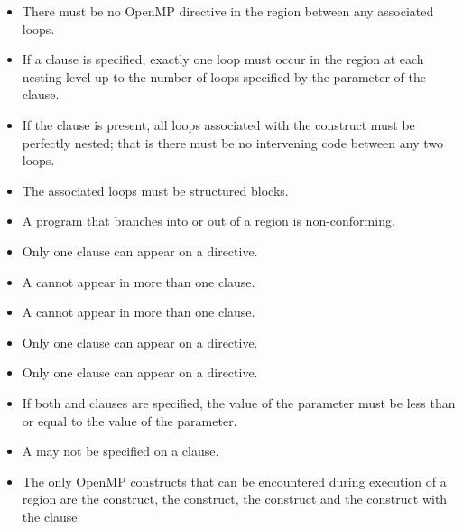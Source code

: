 \restrictions
\begin{itemize}
\item There must be no OpenMP directive in the region between any
associated loops.

\item If a  clause is specified, exactly one loop must
occur in the region at each nesting level up to the number of loops
specified by the parameter of the  clause.

\item If the  clause is present, all loops associated
with the construct must be perfectly nested; that is there must be
no intervening code between any two loops.

\item The associated loops must be structured blocks.

\item A program that branches into or out of a  region is non-conforming.

\item Only one  clause can appear on a  directive.

\item A  cannot appear in more than one  clause.

\item A  cannot appear in more than one  clause.

\item Only one  clause can appear on a  directive.

\item Only one  clause can appear on a  directive.

\item If both  and  clauses are specified, the value of the  parameter must be less than or equal to the value of the  parameter.

\item A  may not be specified on a  clause.

\item The only OpenMP constructs that can be encountered during execution of a
 region are the  construct, the 
construct, the  construct and the  construct with
the  clause.


\end{itemize}
